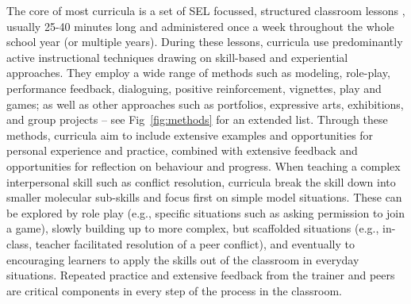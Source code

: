 \documentclass[prodmode,acmtochi]{acmsmall}
\begin{document}

  

The core of most curricula is a set of SEL focussed, structured classroom lessons \cite{jones2012social}, usually 25-40 minutes long and administered once a week throughout the whole school year (or multiple years). During these lessons, curricula use predominantly active instructional techniques drawing on skill-based and experiential approaches. They employ a wide range of methods such as modeling, role-play, performance feedback, dialoguing, positive reinforcement, vignettes, play and games; as well as other approaches such as portfolios, expressive arts, exhibitions, and group projects -- see Fig~\ref{fig:methods} for an extended list. Through these methods, curricula aim to include extensive examples and opportunities for personal experience and practice, combined with extensive feedback and opportunities for reflection on behaviour and progress. When teaching a complex interpersonal skill such as conflict resolution, curricula break the skill down into smaller molecular sub-skills and focus first on simple model situations. These can be explored by role play (e.g., specific situations such as asking permission to join a game), slowly building up to more complex, but scaffolded situations (e.g., in-class, teacher facilitated resolution of a peer conflict), and eventually to encouraging learners to apply the skills out of the classroom in everyday situations. Repeated practice and extensive feedback from the trainer and peers are critical components in every step of the process in the classroom. 
\end{document}

